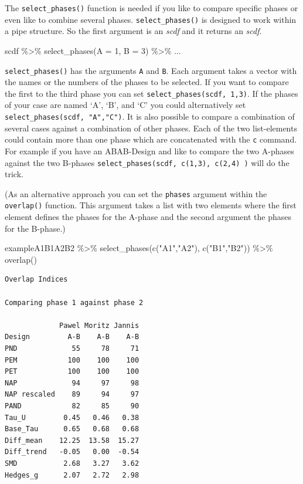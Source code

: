 \documentclass[
  letterpaper,
  DIV=11,
  numbers=noendperiod]{scrreprt}
\newenvironment{Shaded}{\begin{snugshade}}{\end{snugshade}}
\newcommand{\AttributeTok}[1]{\textcolor[rgb]{0.40,0.45,0.13}{#1}}
\newcommand{\DecValTok}[1]{\textcolor[rgb]{0.68,0.00,0.00}{#1}}
\newcommand{\FunctionTok}[1]{\textcolor[rgb]{0.28,0.35,0.67}{#1}}
\newcommand{\NormalTok}[1]{\textcolor[rgb]{0.00,0.23,0.31}{#1}}
\newcommand{\SpecialCharTok}[1]{\textcolor[rgb]{0.37,0.37,0.37}{#1}}
\newcommand{\StringTok}[1]{\textcolor[rgb]{0.13,0.47,0.30}{#1}}
\begin{document}
The \texttt{select\_phases()} function is needed if you like to compare
specific phases or even like to combine several phases.
\texttt{select\_phases()} is designed to work within a pipe structure.
So the first argument is an \emph{scdf} and it returns an \emph{scdf}.

\begin{Shaded}
\begin{Highlighting}[]
\NormalTok{scdf }\SpecialCharTok{\%\textgreater{}\%} \FunctionTok{select\_phases}\NormalTok{(}\AttributeTok{A =} \DecValTok{1}\NormalTok{, }\AttributeTok{B =} \DecValTok{3}\NormalTok{) }\SpecialCharTok{\%\textgreater{}\%}\NormalTok{ ...}
\end{Highlighting}
\end{Shaded}

\texttt{select\_phases()} has the arguments \texttt{A} and \texttt{B}.
Each argument takes a vector with the names or the numbers of the phases
to be selected. If you want to compare the first to the third phase you
can set \texttt{select\_phases(scdf,\ 1,3)}. If the phases of your case
are named `A', `B', and `C' you could alternatively set
\texttt{select\_phases(scdf,\ "A","C")}. It is also possible to compare
a combination of several cases against a combination of other phases.
Each of the two list-elements could contain more than one phase which
are concatenated with the \texttt{c} command. For example if you have an
ABAB-Design and like to compare the two A-phases against the two
B-phases \texttt{select\_phases(scdf,\ c(1,3),\ c(2,4)\ )} will do the
trick.

(As an alternative approach you can set the \texttt{phases} argument
within the \texttt{overlap()} function. This argument takes a list with
two elements where the first element defines the phases for the A-phase
and the second argument the phases for the B-phase.)

\begin{Shaded}
\begin{Highlighting}[]
\NormalTok{exampleA1B1A2B2 }\SpecialCharTok{\%\textgreater{}\%}
  \FunctionTok{select\_phases}\NormalTok{(}\FunctionTok{c}\NormalTok{(}\StringTok{"A1"}\NormalTok{,}\StringTok{"A2"}\NormalTok{), }\FunctionTok{c}\NormalTok{(}\StringTok{"B1"}\NormalTok{,}\StringTok{"B2"}\NormalTok{)) }\SpecialCharTok{\%\textgreater{}\%}
  \FunctionTok{overlap}\NormalTok{()}
\end{Highlighting}
\end{Shaded}

\begin{verbatim}
Overlap Indices

Comparing phase 1 against phase 2 

             Pawel Moritz Jannis
Design         A-B    A-B    A-B
PND             55     78     71
PEM            100    100    100
PET            100    100    100
NAP             94     97     98
NAP rescaled    89     94     97
PAND            82     85     90
Tau_U         0.45   0.46   0.38
Base_Tau      0.65   0.68   0.68
Diff_mean    12.25  13.58  15.27
Diff_trend   -0.05   0.00  -0.54
SMD           2.68   3.27   3.62
Hedges_g      2.07   2.72   2.98
\end{verbatim}
\end{document}
